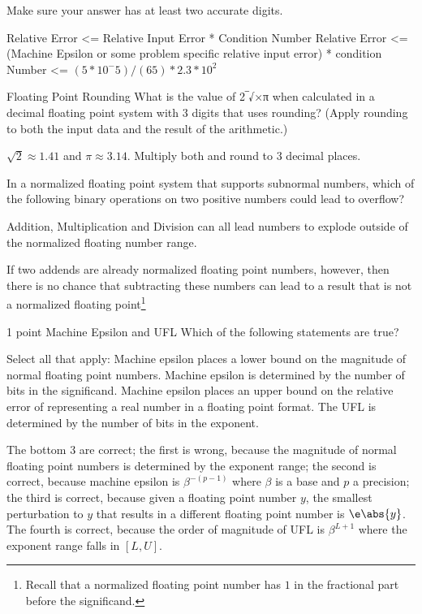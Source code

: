 \documentclass[../main.tex]{subfiles}
\begin{document}
Make sure your answer has at least two accurate digits.

\begin{solution}
    Relative Error <= Relative Input Error * Condition Number
    Relative Error <= (Machine Epsilon or some problem specific relative input error) * condition Number
    <= $(5 * 10^-5)/(65) * 2.3 * 10^2$
\end{solution}


Floating Point Rounding
What is the value of 2‾√×π when calculated in a decimal floating point system with 3 digits that uses rounding? (Apply rounding to both the input data and the result of the arithmetic.)

\begin{solution}
    $\sqrt{2} \approx 1.41$ and $\pi \approx 3.14$. Multiply both and round to $3$ decimal places.
\end{solution}

In a normalized floating point system that supports subnormal numbers, which of the following binary operations on two positive numbers could lead to overflow?

\begin{solution}
    Addition, Multiplication and Division can all lead numbers to explode outside of the normalized floating number range.

    If two addends are already normalized floating point numbers, however, then there is no chance that subtracting these numbers can lead to a result that is not a normalized floating point\footnote{Recall that a normalized floating point number has $1$ in the fractional part before the significand.}
\end{solution}

1 point
Machine Epsilon and UFL
Which of the following statements are true?

Select all that apply:
Machine epsilon places a lower bound on the magnitude of normal floating point numbers.
Machine epsilon is determined by the number of bits in the significand.
Machine epsilon places an upper bound on the relative error of representing a real number in a floating point format.
The UFL is determined by the number of bits in the exponent.

\begin{solution}
    The bottom $3$ are correct; the first is wrong, because the magnitude of normal floating point numbers is determined by the exponent range; the second is correct, because machine epsilon is $\beta^{-(p-1)}$ where $\beta$ is a base and $p$ a precision; the third is correct, because given a floating point number $y$, the smallest perturbation to $y$ that results in a different floating point number is $\e \abs{y}$. The fourth is correct, because the order of magnitude of UFL is $\beta^{L+1}$ where the exponent range falls in $\left[ L,U \right]$.
\end{solution}
\end{document}

